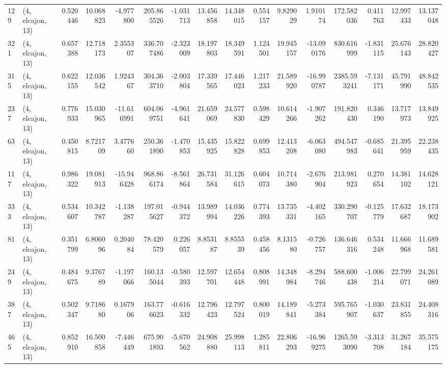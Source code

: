 \begin{tabular}{llrrrrrrrrrrrrrr}
129 &  (4, elcajon, 13) &   0.520446 &  10.068823 &  -4.977800 &   205.865526 &  -1.031713 &  13.456858 &  14.348015 &  0.554157 &   9.829029 &   1.910174 &   172.582036 &  0.411763 &  12.997433 &  13.137048 \\
321 &  (4, elcajon, 13) &   0.657388 &  12.718173 &   2.355307 &   336.707486 &  -2.323009 &  18.197803 &  18.349591 &  1.124501 &  19.945157 & -13.090176 &   830.616999 & -1.831115 &  25.676143 &  28.820427 \\
315 &  (4, elcajon, 13) &   0.622155 &  12.036542 &   1.924367 &   304.363710 &  -2.003804 &  17.339565 &  17.446023 &  1.217233 &  21.589920 & -16.990787 &  2385.593241 & -7.131171 &  45.791990 &  48.842535 \\
237 &  (4, elcajon, 13) &   0.776933 &  15.030965 & -11.616991 &   604.069751 &  -4.961641 &  21.659069 &  24.577830 &  0.598429 &  10.614266 &  -1.907262 &   191.820430 &  0.346190 &  13.717973 &  13.849925 \\
63  &  (4, elcajon, 13) &   0.450815 &   8.721709 &   3.477660 &   250.361890 &  -1.470853 &  15.435925 &  15.822828 &  0.699853 &  12.413208 &  -6.063080 &   494.547983 & -0.685641 &  21.395959 &  22.238435 \\
117 &  (4, elcajon, 13) &   0.986322 &  19.081913 & -15.946428 &   968.866174 &  -8.561864 &  26.731584 &  31.126615 &  0.604073 &  10.714380 &  -2.676904 &   213.981923 &  0.270654 &  14.381102 &  14.628121 \\
333 &  (4, elcajon, 13) &   0.534607 &  10.342787 &  -1.138287 &   197.015627 &  -0.944372 &  13.989994 &  14.036226 &  0.774393 &  13.735331 &  -4.402165 &   330.290707 & -0.125779 &  17.632687 &  18.173902 \\
81  &  (4, elcajon, 13) &   0.351799 &   6.806096 &   0.204084 &    78.420579 &   0.226057 &   8.853187 &   8.855539 &  0.458456 &   8.131580 &  -0.726757 &   136.646316 &  0.534248 &  11.666968 &  11.689581 \\
249 &  (4, elcajon, 13) &   0.484675 &   9.376789 &  -1.197066 &   160.135044 &  -0.580393 &  12.597701 &  12.654448 &  0.808991 &  14.348984 &  -8.294746 &   588.600438 & -1.006214 &  22.799071 &  24.261089 \\
387 &  (4, elcajon, 13) &   0.502347 &   9.718680 &   0.167906 &   163.776623 &  -0.616332 &  12.796423 &  12.797524 &  0.800019 &  14.189841 &  -5.273384 &   595.765907 & -1.030637 &  23.831855 &  24.408316 \\
465 &  (4, elcajon, 13) &   0.852910 &  16.500858 &  -7.446449 &   675.901893 &  -5.670562 &  24.908880 &  25.998113 &  1.285811 &  22.806293 & -16.969275 &  1265.593090 & -3.313708 &  31.267184 &  35.575175 \\

\end{tabular}
